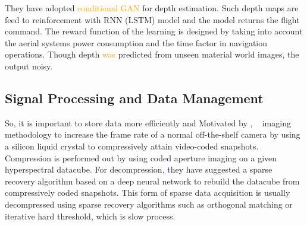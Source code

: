 They have adopted \textcolor{orange}{conditional GAN \cite{isola2017image}}  for depth estimation. Such depth maps are feed to reinforcement with RNN (LSTM) model and the model returns the flight command. The reward function of the learning is designed by taking into account the aerial systems power consumption and the time factor in navigation operations. Though depth \textcolor{orange}{was} predicted from unseen material world images, the output  noisy.

\subsection{Signal Processing and Data Management}
So, it is important to store data more efficiently and 
Motivated by \cite{hitomi2011video}, ~\cite{kumar2018onboard}  imaging methodology to increase the frame rate of a normal off-the-shelf camera by using a silicon liquid crystal to compressively attain video-coded snapshots. Compression is performed out by using coded aperture imaging on a given hyperspectral datacube. For decompression, \textcolor{blue}{t}hey have suggested a sparse recovery algorithm based on a deep neural network to rebuild the datacube from compressively coded snapshots. This form of sparse data acquisition is usually decompressed using sparse recovery algorithms such as orthogonal matching or iterative hard threshold, which is  slow process.

